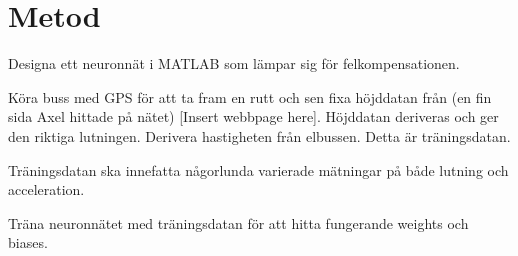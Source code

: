 \section{Metod}

Designa ett neuronnät i MATLAB som lämpar sig för felkompensationen.

Köra buss med GPS för att ta fram en rutt och sen fixa höjddatan från
(en fin sida Axel hittade på nätet) [Insert webbpage here]. Höjddatan deriveras och ger den riktiga lutningen.
Derivera hastigheten från elbussen.
Detta är träningsdatan. 

Träningsdatan ska innefatta någorlunda varierade mätningar på både lutning och acceleration.

Träna neuronnätet med träningsdatan för att hitta fungerande weights och biases.
